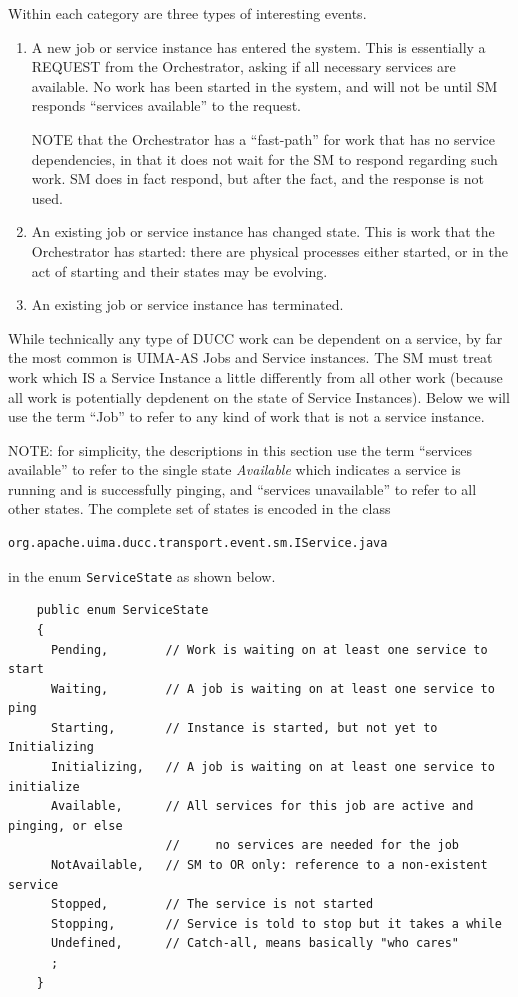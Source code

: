     Within each category are three types of interesting events.
    \begin{enumerate}
      \item A new job or service instance has entered the system.  This is essentially a REQUEST
        from the Orchestrator, asking if all necessary services are available.  No work
        has been started in the system, and will not be until SM responds ``services available''
        to the request.

        NOTE that the Orchestrator has a ``fast-path'' for work that has no service dependencies, in
        that it does not wait for the SM to respond regarding such work.  SM does in fact respond,
        but after the fact, and the response is not used.

      \item An existing job or service instance has changed state.  This is work that the 
        Orchestrator has started: there are physical processes either started, or in the act
        of starting and their states may be evolving.

      \item An existing job or service instance has terminated.
    \end{enumerate}
    
    While technically any type of DUCC work can be dependent on a service, by far the most common
    is UIMA-AS Jobs and Service instances.  The SM must treat work which IS a Service Instance
    a little differently from all other work (because all work is potentially depdenent on the
    state of Service Instances). Below we will use the term ``Job'' to refer to any
    kind of work that is not a service instance.

    NOTE: for simplicity, the descriptions in this section use the term ``services available'' to refer
    to the single state {\em Available} which indicates a service is running and is successfully
    pinging, and  ``services unavailable'' to refer to all other states.  The complete set of
    states is encoded in the class
\begin{verbatim}
org.apache.uima.ducc.transport.event.sm.IService.java
\end{verbatim}
    in the enum {\tt ServiceState} as shown below.
\begin{verbatim}
    public enum ServiceState 
    {
      Pending,        // Work is waiting on at least one service to start
      Waiting,        // A job is waiting on at least one service to ping
      Starting,       // Instance is started, but not yet to Initializing
      Initializing,   // A job is waiting on at least one service to initialize
      Available,      // All services for this job are active and pinging, or else
                      //     no services are needed for the job
      NotAvailable,   // SM to OR only: reference to a non-existent service 
      Stopped,        // The service is not started
      Stopping,       // Service is told to stop but it takes a while
      Undefined,      // Catch-all, means basically "who cares"
      ;
    }
\end{verbatim}

